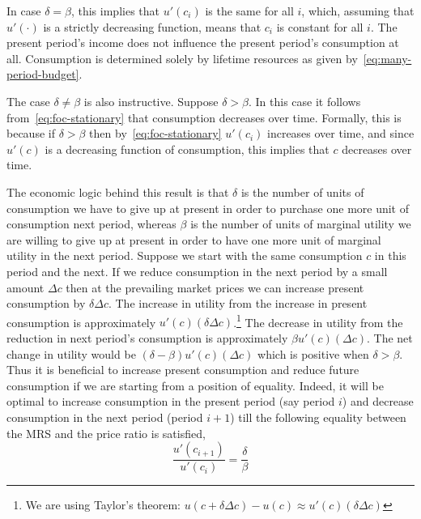 \documentclass[11pt,reqno,openany]{amsbook}
\begin{document}
In case $\delta=\beta$, this implies that $u'(c_i)$ is the same for
all $i$, which, assuming that $u'(\cdot)$ is a strictly decreasing
function, means that $c_i$ is constant for all $i$. The present
period's income does not influence the present period's consumption at
all. Consumption is determined solely by lifetime resources as given
by~\eqref{eq:many-period-budget}.

The case $\delta \neq \beta$ is also instructive. Suppose
$\delta>\beta$. In this case it follows from~\eqref{eq:foc-stationary}
that consumption decreases over time. Formally, this is because if
$\delta>\beta$ then by~\eqref{eq:foc-stationary} $u'(c_i)$ increases
over time, and since $u'(c)$ is a decreasing function of consumption,
this implies that $c$ decreases over time. 

The economic logic behind this result is that $\delta$ is the number of
units of consumption we have to give up at present in order to
purchase one more unit of consumption next period, whereas $\beta$ is
the number of units of marginal utility we are willing to give up at
present in order to have one more unit of marginal utility in the next
period. Suppose we start with the same consumption $c$ in this period and
the next. If we reduce consumption in the next period by a small
amount $\Delta c$ then at the prevailing market prices we can
increase present consumption by $\delta\Delta c$. The increase in
utility from the increase in present consumption is approximately
$u'(c)(\delta\Delta c)$.\footnote{We are using Taylor's theorem:
  $u(c+\delta\Delta c)-u(c) \approx u'(c)(\delta\Delta c)$} The decrease in utility from the reduction in
next period's consumption is approximately $\beta u'(c)(\Delta c)$. The
net change in utility would be $(\delta-\beta)u'(c)(\Delta c)$ which
is positive when $\delta>\beta$. Thus it is beneficial to increase present consumption and
reduce future consumption if we are starting from a position of
equality. Indeed, it will be optimal to increase consumption in the
present period (say period $i$) and decrease consumption in the next
period (period $i+1$) till the following equality between the MRS and
the price ratio is satisfied,
\[\frac{u'(c_{i+1})}{u'(c_i)}=\frac{\delta}{\beta}\]
\end{document}
